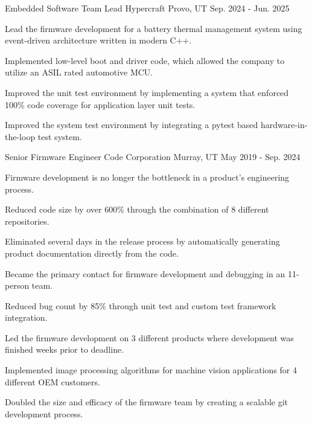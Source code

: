 


\begin{cventries}


\cventry
{Embedded Software Team Lead} %
{Hypercraft} %
{Provo, UT} %
{Sep. 2024 - Jun. 2025} %
{ %
\begin{cvitems}
\item Lead the firmware development for a battery thermal management system using event-driven architecture written in modern C++.
\item Implemented low-level boot and driver code, which allowed the company to utilize an ASIL rated automotive MCU.
\item Improved the unit test environment by implementing a system that enforced 100\% code coverage for application layer unit tests.
\item Improved the system test environment by integrating a pytest based hardware-in-the-loop test system.
\end{cvitems}
}



\cventry
{Senior Firmware Engineer} %
{Code Corporation} %
{Murray, UT} %
{May 2019 - Sep. 2024} %
{ %
\begin{cvitems}
\item Firmware development is no longer the bottleneck in a product's engineering process.
\item Reduced code size by over 600\% through the combination of 8 different repositories.
\item Eliminated several days in the release process by automatically generating product documentation directly from the code.
\item Became the primary contact for firmware development and debugging in an 11-person team.
\item Reduced bug count by 85\% through unit test and custom test framework integration.
\item Led the firmware development on 3 different products where development was finished weeks prior to deadline.
\item Implemented image processing algorithms for machine vision applications for 4 different OEM customers.
\item Doubled the size and efficacy of the firmware team by creating a scalable git development process.
\end{cvitems}
}


\end{cventries}
